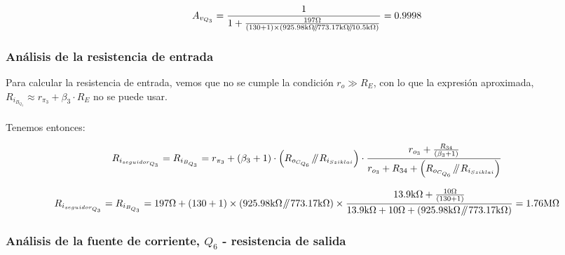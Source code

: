 \begin{equation*}
A_{v_{Q_{3}}} = \frac{1}{1 + \frac { 197 \si[per-mode=symbol]{\ohm} }{  \left(  130 + 1 \right) \times \left(  925.98 \si[per-mode=symbol]{\kilo\ohm} \parallelresistors 773.17 \si[per-mode=symbol]{\kilo\ohm} \parallelresistors 10.5 \si[per-mode=symbol]{\kilo\ohm}  \right)  } } = 0.9998
\end{equation*}

\subsubsection{Análisis de la resistencia de entrada}


Para calcular la  resistencia de entrada, vemos que no se cumple la condición $r_{o} \gg R_{E}$, con lo que la expresión aproximada, $ R_{i_{B_{Q_{3}}}} \approx r_{\pi_{3}} + \beta_{3} \cdot R_{E}$ no se puede usar.\\ \\

Tenemos entonces:

\begin{equation}
R_{i_{seguidor_{Q_{3}}}} = R_{i_{B_{Q_{3}}}} = r_{\pi_{3}} + \left( \beta_{3} + 1 \right) \cdot  \left(  R_{o_{C_{Q_{6}}}} \parallelresistors R_{i_{Sziklai}}   \right)  \cdot \frac{  r_{o_{3}} + \frac{ R_{34} }{\left( \beta_{3} + 1 \right)} }{  r_{o_{3}} + R_{34} +  \left(  R_{o_{C_{Q_{6}}}} \parallelresistors R_{i_{Sziklai}}   \right)  }
\end{equation}


\begin{equation*}
R_{i_{seguidor_{Q_{3}}}} = R_{i_{B_{Q_{3}}}} = 197 \si[per-mode=symbol]{\ohm} + \left( 130 + 1 \right) \times \left(  925.98 \si[per-mode=symbol]{\kilo\ohm} \parallelresistors 773.17 \si[per-mode=symbol]{\kilo\ohm} \right)  \times \frac{  13.9 \si[per-mode=symbol]{\kilo\ohm} + \frac{ 10 \si[per-mode=symbol]{\ohm} }{\left( 130 + 1 \right)} }{  13.9 \si[per-mode=symbol]{\kilo\ohm} + 10 \si[per-mode=symbol]{\ohm} +  \left(  925.98 \si[per-mode=symbol]{\kilo\ohm} \parallelresistors 773.17 \si[per-mode=symbol]{\kilo\ohm} \right)  } = 1.76 \si[per-mode=symbol]{\mega\ohm} 
\end{equation*}


\subsubsection{Análisis de la fuente de corriente, $Q_{6}$ - resistencia de salida}

